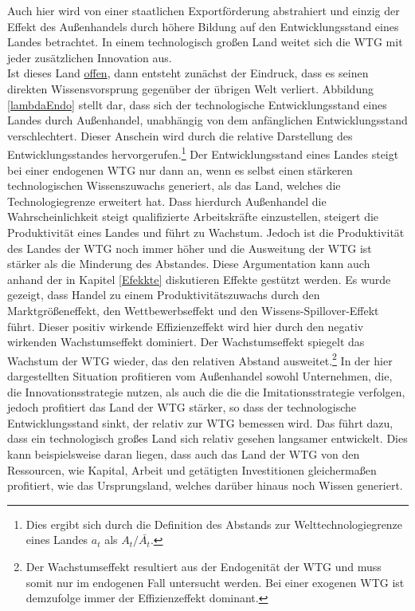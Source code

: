 Auch hier wird von einer staatlichen Exportförderung abstrahiert und einzig der Effekt des Außenhandels durch höhere Bildung auf den Entwicklungsstand eines Landes betrachtet. In einem technologisch großen Land weitet sich die WTG mit jeder zusätzlichen Innovation aus.\\ Ist dieses Land \underline{offen}, dann entsteht zunächst der Eindruck, dass es seinen direkten Wissensvorsprung gegenüber der übrigen Welt verliert. Abbildung \ref{lambdaEndo} stellt dar, dass sich der technologische Entwicklungsstand eines Landes durch Außenhandel, unabhängig von dem anfänglichen Entwicklungsstand verschlechtert. Dieser Anschein wird durch die relative Darstellung des Entwicklungsstandes hervorgerufen.\footnote{Dies ergibt sich durch die Definition des Abstands zur Welttechnologiegrenze eines Landes $a_t$ als $A_t/\bar{A_t}$.} Der Entwicklungsstand eines Landes steigt bei einer endogenen WTG nur dann an, wenn es selbst einen stärkeren technologischen Wissenszuwachs generiert, als das Land, welches die Technologiegrenze erweitert hat. Dass hierdurch Außenhandel die Wahrscheinlichkeit steigt qualifizierte Arbeitskräfte einzustellen, steigert die Produktivität eines Landes und führt zu Wachstum. Jedoch ist die Produktivität des Landes der WTG noch immer höher und die Ausweitung der WTG ist stärker als die Minderung des Abstandes. Diese Argumentation kann auch anhand der in Kapitel \ref{Efekkte} diskutieren Effekte gestützt werden. Es wurde gezeigt, dass Handel zu einem Produktivitätszuwachs durch den Marktgrößeneffekt, den Wettbewerbseffekt und den Wissens-Spillover-Effekt führt. Dieser positiv wirkende Effizienzeffekt wird hier durch den negativ wirkenden Wachstumseffekt dominiert. Der Wachstumseffekt spiegelt das Wachstum der WTG wieder, das den relativen Abstand ausweitet.\footnote{Der Wachstumseffekt resultiert aus der Endogenität der WTG und muss somit nur im endogenen Fall untersucht werden. Bei einer exogenen WTG ist demzufolge immer der Effizienzeffekt dominant.} In der hier dargestellten Situation profitieren vom Außenhandel sowohl Unternehmen, die, die \textcolor[rgb]{0.74,0.97,0.22}{Innovationsstrategie} nutzen, als auch die die die \textcolor[rgb]{0,0.32,0}{Imitationsstrategie} verfolgen, jedoch profitiert das Land der WTG stärker, so dass der technologische Entwicklungsstand sinkt, der relativ zur WTG bemessen wird. Das führt dazu, dass ein technologisch großes Land sich relativ gesehen langsamer entwickelt. Dies kann beispielsweise daran liegen, dass auch das Land der WTG von den Ressourcen, wie Kapital, Arbeit und getätigten Investitionen gleichermaßen profitiert, wie das Ursprungsland, welches darüber hinaus noch Wissen generiert.\\
